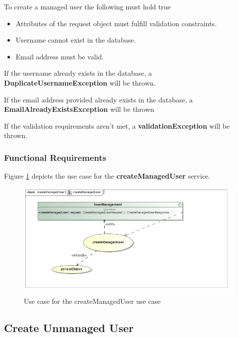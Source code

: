 To create a managed user the following must hold true
\begin{itemize}
	\item Attributes of the request object must fulfill validation constraints.
	\item Username cannot exist in the database.
	\item Email address must be valid.
\end{itemize}

If the username already exists in the database, a \textbf{DuplicateUsernameException} will be thrown.

If the email address provided already exists in the database, a \textbf{EmailAlreadyExistsException}
will be thrown

If the validation requirements aren't met, a \textbf{validationException} will be thrown.

\subsubsection{Functional Requirements}
Figure \ref{fig:createManagedUserUseCase} depicts the use case for the \textbf{createManagedUser} service.

\begin{figure}[H]
	\begin{center}
		\includegraphics[scale=0.55]{../Diagrams and Charts/Users/Create Managed User Use Case.jpg}
		\caption{Use case for the createManagedUser use case}
		\label{fig:createManagedUserUseCase}
	\end{center}
\end{figure}

\subsection{Create Unmanaged User}

